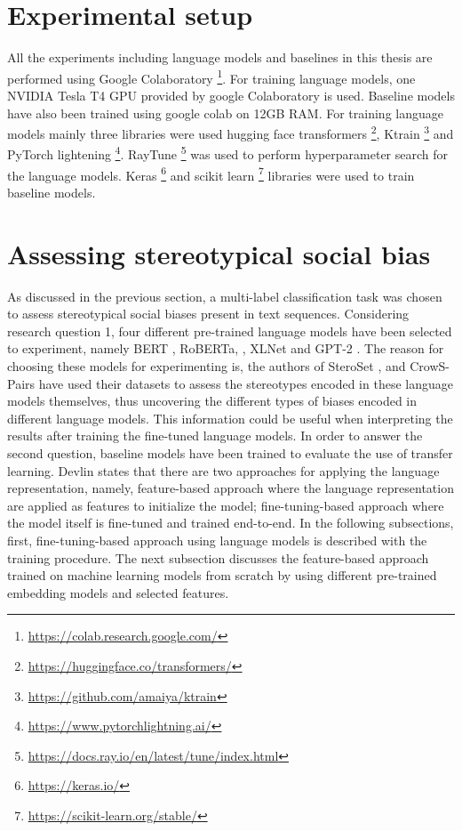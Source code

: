 \section{Experimental setup}
\label{experimental_setup}
All the experiments including language models and baselines in this thesis are performed using Google Colaboratory \footnote{\url{https://colab.research.google.com/}}. For training language models, one NVIDIA Tesla T4 GPU provided by google Colaboratory is used. Baseline models have also been trained using google colab on 12GB RAM. For training language models mainly three libraries were used hugging face transformers \footnote{\url{https://huggingface.co/transformers/}}, Ktrain \footnote{\url{https://github.com/amaiya/ktrain}} and PyTorch lightening \footnote{\url{https://www.pytorchlightning.ai/}}. RayTune \footnote{\url{https://docs.ray.io/en/latest/tune/index.html}} was used to perform hyperparameter search for the language models. Keras \footnote{\url{https://keras.io/}} and scikit learn \footnote{\url{https://scikit-learn.org/stable/}} libraries were used to train baseline models.

\section{Assessing stereotypical social bias} \label{assessing_social_biases}
As discussed in the previous section, a multi-label classification task was chosen to assess stereotypical social biases present in text sequences. Considering research question 1, four different pre-trained language models have been selected to experiment, namely BERT \cite{devlin2018bert}, RoBERTa, \cite{liu2019roberta}, XLNet \cite{yang2019xlnet} and GPT-2  \cite{radford2019language}. The reason for choosing these models for experimenting is, the authors of SteroSet \cite{nadeem2020stereoset}, and CrowS-Pairs\cite{nangia2020crows} have used their datasets to assess the stereotypes encoded in these language models themselves, thus uncovering the different types of biases encoded in different language models. This information could be useful when interpreting the results after training the fine-tuned language models. In order to answer the second question, baseline models have been trained to evaluate the use of transfer learning. Devlin\cite{devlin2018bert} states that there are two approaches for applying the language representation, namely, feature-based approach where the language representation are applied as features to initialize the model; fine-tuning-based approach where the model itself is fine-tuned and trained end-to-end. In the following subsections, first, fine-tuning-based approach using language models is described with the training procedure. The next subsection discusses the feature-based approach trained on machine learning models from scratch by using different pre-trained embedding models and selected features. 
